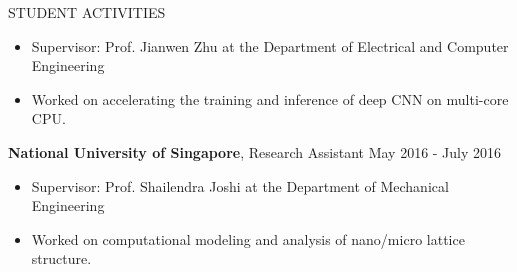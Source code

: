 \documentclass{cv}
\begin{document}
\begin{rSection}{STUDENT ACTIVITIES}
  \vspace{-0.25em}
  \begin{itemize}[noitemsep,topsep=0pt]
    \item Supervisor: Prof. Jianwen Zhu at the Department of Electrical and Computer Engineering
    \item Worked on accelerating the training and inference of deep CNN on multi-core CPU.
  \end{itemize}
  \item \textbf{National University of Singapore}, Research Assistant \hfill May 2016 - July 2016
  \vspace{-0.25em}
  \begin{itemize}[noitemsep,topsep=0pt]
    \item Supervisor: Prof. Shailendra Joshi at the Department of Mechanical Engineering
    \item Worked on computational modeling and analysis of nano/micro lattice structure.
  \end{itemize}
\end{rSection}
\end{document}
